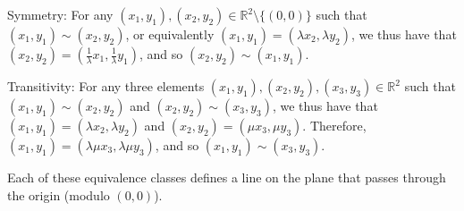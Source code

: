 \smallskip

Symmetry: For any $(x_1, y_1), (x_2, y_2) \in \mathbb{R}^2 \setminus \{(0, 0)\}$ such that $(x_1, y_1) \sim (x_2, y_2)$, or equivalently $(x_1, y_1) = (\lambda x_2, \lambda y_2)$, we thus have that $(x_2, y_2) = \left(\frac{1}{\lambda}x_1, \frac{1}{\lambda}y_1\right)$, and so $(x_2, y_2) \sim (x_1, y_1)$.

\smallskip

Transitivity: For any three elements $(x_1, y_1), (x_2, y_2), (x_3, y_3) \in \mathbb{R}^2$ such that\\$(x_1, y_1) \sim (x_2, y_2)$ and $(x_2, y_2) \sim (x_3, y_3)$, we thus have that $(x_1, y_1) = (\lambda x_2, \lambda y_2)$ and $(x_2, y_2) = (\mu x_3, \mu y_3)$. Therefore, $(x_1, y_1) = (\lambda\mu x_3, \lambda\mu y_3)$, and so $(x_1, y_1) \sim (x_3, y_3)$.

\smallskip

Each of these equivalence classes defines a line on the plane that passes through the origin (modulo $(0,0)$).